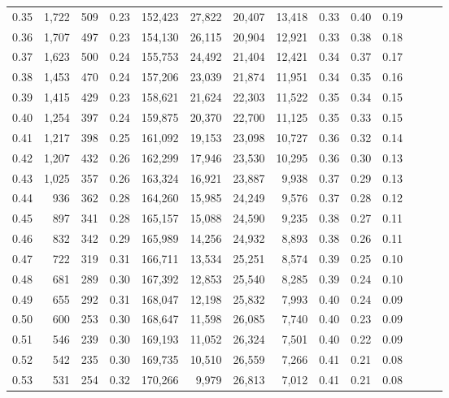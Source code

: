 \begin{tabular}{rrrrrrrrrrrrrr}
0.35 &  1,722 &  509 &  0.23 &  152,423 &   27,822 &  20,407 &  13,418 &  0.33 &  0.40 &      0.19 \\
0.36 &  1,707 &  497 &  0.23 &  154,130 &   26,115 &  20,904 &  12,921 &  0.33 &  0.38 &      0.18 \\
0.37 &  1,623 &  500 &  0.24 &  155,753 &   24,492 &  21,404 &  12,421 &  0.34 &  0.37 &      0.17 \\
0.38 &  1,453 &  470 &  0.24 &  157,206 &   23,039 &  21,874 &  11,951 &  0.34 &  0.35 &      0.16 \\
0.39 &  1,415 &  429 &  0.23 &  158,621 &   21,624 &  22,303 &  11,522 &  0.35 &  0.34 &      0.15 \\
0.40 &  1,254 &  397 &  0.24 &  159,875 &   20,370 &  22,700 &  11,125 &  0.35 &  0.33 &      0.15 \\
0.41 &  1,217 &  398 &  0.25 &  161,092 &   19,153 &  23,098 &  10,727 &  0.36 &  0.32 &      0.14 \\
0.42 &  1,207 &  432 &  0.26 &  162,299 &   17,946 &  23,530 &  10,295 &  0.36 &  0.30 &      0.13 \\
0.43 &  1,025 &  357 &  0.26 &  163,324 &   16,921 &  23,887 &   9,938 &  0.37 &  0.29 &      0.13 \\
0.44 &    936 &  362 &  0.28 &  164,260 &   15,985 &  24,249 &   9,576 &  0.37 &  0.28 &      0.12 \\
0.45 &    897 &  341 &  0.28 &  165,157 &   15,088 &  24,590 &   9,235 &  0.38 &  0.27 &      0.11 \\
0.46 &    832 &  342 &  0.29 &  165,989 &   14,256 &  24,932 &   8,893 &  0.38 &  0.26 &      0.11 \\
0.47 &    722 &  319 &  0.31 &  166,711 &   13,534 &  25,251 &   8,574 &  0.39 &  0.25 &      0.10 \\
0.48 &    681 &  289 &  0.30 &  167,392 &   12,853 &  25,540 &   8,285 &  0.39 &  0.24 &      0.10 \\
0.49 &    655 &  292 &  0.31 &  168,047 &   12,198 &  25,832 &   7,993 &  0.40 &  0.24 &      0.09 \\
0.50 &    600 &  253 &  0.30 &  168,647 &   11,598 &  26,085 &   7,740 &  0.40 &  0.23 &      0.09 \\
0.51 &    546 &  239 &  0.30 &  169,193 &   11,052 &  26,324 &   7,501 &  0.40 &  0.22 &      0.09 \\
0.52 &    542 &  235 &  0.30 &  169,735 &   10,510 &  26,559 &   7,266 &  0.41 &  0.21 &      0.08 \\
0.53 &    531 &  254 &  0.32 &  170,266 &    9,979 &  26,813 &   7,012 &  0.41 &  0.21 &      0.08 \\

\end{tabular}
